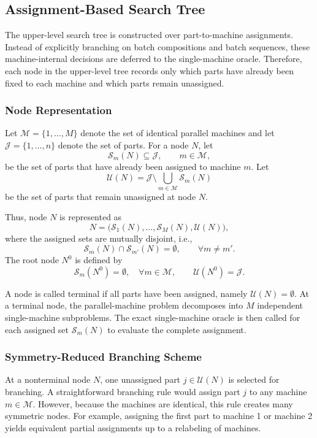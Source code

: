 \documentclass[letterpaper, 10 pt, conference]{ieeeconf}  %
\begin{document}
\subsection{Assignment-Based Search Tree}
\label{subsec:assignment_tree}

The upper-level search tree is constructed over part-to-machine assignments.
Instead of explicitly branching on batch compositions and batch sequences,
these machine-internal decisions are deferred to the single-machine oracle.
Therefore, each node in the upper-level tree records only which parts have
already been fixed to each machine and which parts remain unassigned.

\subsubsection{Node Representation}

Let $\mathcal{M}=\{1,\dots,M\}$ denote the set of identical parallel machines
and let $\mathcal{J}=\{1,\dots,n\}$ denote the set of parts. For a node $N$,
let
\[
\mathcal{S}_m(N)\subseteq \mathcal{J}, \qquad m\in\mathcal{M},
\]
be the set of parts that have already been assigned to machine $m$. Let
\[
\mathcal{U}(N)=\mathcal{J}\setminus
\bigcup_{m\in\mathcal{M}}\mathcal{S}_m(N)
\]
be the set of parts that remain unassigned at node $N$.

Thus, node $N$ is represented as
\[
N=
\bigl(
\mathcal{S}_1(N),\dots,\mathcal{S}_M(N),\mathcal{U}(N)
\bigr),
\]
where the assigned sets are mutually disjoint, i.e.,
\[
\mathcal{S}_m(N)\cap \mathcal{S}_{m'}(N)=\emptyset,
\qquad \forall m\neq m'.
\]
The root node $N^0$ is defined by
\[
\mathcal{S}_m(N^0)=\emptyset,\quad \forall m\in\mathcal{M},
\qquad
\mathcal{U}(N^0)=\mathcal{J}.
\]

A node is called terminal if all parts have been assigned, namely
$\mathcal{U}(N)=\emptyset$. At a terminal node, the parallel-machine problem
decomposes into $M$ independent single-machine subproblems. The exact
single-machine oracle is then called for each assigned set
$\mathcal{S}_m(N)$ to evaluate the complete assignment.

\subsubsection{Symmetry-Reduced Branching Scheme}

At a nonterminal node $N$, one unassigned part $j\in\mathcal{U}(N)$ is
selected for branching. A straightforward branching rule would assign part
$j$ to any machine $m\in\mathcal{M}$. However, because the machines are
identical, this rule creates many symmetric nodes. For example, assigning
the first part to machine 1 or machine 2 yields equivalent partial
assignments up to a relabeling of machines.
\end{document}
